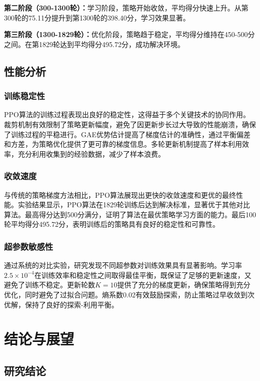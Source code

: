 \documentclass[12pt,a4paper]{article}
\begin{document}
\textbf{第二阶段（300-1300轮）：}学习阶段，策略开始收敛，平均得分快速上升。从第300轮的75.11分提升到第1300轮的398.40分，学习效果显著。

\textbf{第三阶段（1300-1829轮）：}优化阶段，策略趋于稳定，平均得分维持在450-500分之间。在第1829轮达到平均得分495.72分，成功解决环境。

\subsection{性能分析}

\subsubsection{训练稳定性}

PPO算法的训练过程表现出良好的稳定性，这得益于多个关键技术的协同作用。裁剪机制有效限制了策略更新幅度，避免了因更新步长过大导致的性能崩溃，确保了训练过程的平稳进行。GAE优势估计提高了梯度估计的准确性，通过平衡偏差和方差，为策略优化提供了更可靠的梯度信息。多轮更新机制提高了样本利用效率，充分利用收集到的经验数据，减少了样本浪费。

\subsubsection{收敛速度}

与传统的策略梯度方法相比，PPO算法展现出更快的收敛速度和更优的最终性能。实验结果显示，PPO算法在1829轮训练后达到解决标准，显著优于其他对比算法。最高得分达到500分满分，证明了算法在最优策略学习方面的能力。最后100轮平均得分495.72分，表明训练后的策略具有良好的稳定性和可靠性。

\subsubsection{超参数敏感性}

通过系统的对比实验，研究发现不同超参数对训练效果具有显著影响。学习率$2.5 \times 10^{-4}$在训练效率和稳定性之间取得最佳平衡，既保证了足够的更新速度，又避免了训练不稳定。更新轮数$K=10$提供了充分的梯度更新，确保策略得到充分优化，同时避免了过拟合问题。熵系数0.02有效鼓励探索，防止策略过早收敛到次优解，保持了良好的探索-利用平衡。

\section{结论与展望}

\subsection{研究结论}
\end{document}
